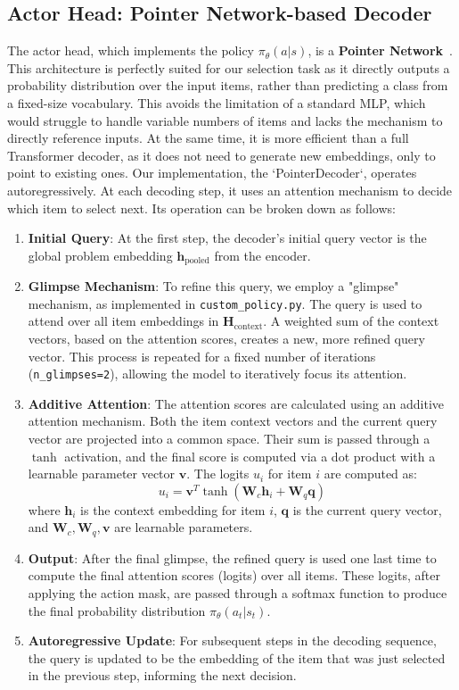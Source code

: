 \subsection{Actor Head: Pointer Network-based Decoder}
The actor head, which implements the policy \(\pi_\theta(a|s)\), is a \textbf{Pointer Network}~\cite{vinyalsPointerNetworks2017}.
This architecture is perfectly suited for our selection task as it directly outputs a probability distribution over the input items, rather than predicting a class from a fixed-size vocabulary.
This avoids the limitation of a standard MLP, which would struggle to handle variable numbers of items and lacks the mechanism to directly reference inputs.
At the same time, it is more efficient than a full Transformer decoder, as it does not need to generate new embeddings, only to point to existing ones.
Our implementation, the `PointerDecoder`, operates autoregressively. At each decoding step, it uses an attention mechanism to decide which item to select next.
Its operation can be broken down as follows:
\begin{enumerate}
    \item \textbf{Initial Query}: At the first step, the decoder's initial query vector is the global problem embedding \(\mathbf{h}_{\text{pooled}}\) from the encoder.
    \item \textbf{Glimpse Mechanism}: To refine this query, we employ a "glimpse" mechanism, as implemented in \texttt{custom\_policy.py}.
The query is used to attend over all item embeddings in \(\mathbf{H}_{\text{context}}\).
A weighted sum of the context vectors, based on the attention scores, creates a new, more refined query vector.
This process is repeated for a fixed number of iterations (\texttt{n\_glimpses=2}), allowing the model to iteratively focus its attention.
    \item \textbf{Additive Attention}: The attention scores are calculated using an additive attention mechanism.
Both the item context vectors and the current query vector are projected into a common space.
Their sum is passed through a \(\tanh\) activation, and the final score is computed via a dot product with a learnable parameter vector \(\mathbf{v}\).
The logits \(u_i\) for item \(i\) are computed as:
    \[ u_i = \mathbf{v}^T \tanh(\mathbf{W}_c \mathbf{h}_i + \mathbf{W}_q \mathbf{q}) \]
    where \(\mathbf{h}_i\) is the context embedding for item \(i\), \(\mathbf{q}\) is the current query vector, and \(\mathbf{W}_c, \mathbf{W}_q, \mathbf{v}\) are learnable parameters.
    \item \textbf{Output}: After the final glimpse, the refined query is used one last time to compute the final attention scores (logits) over all items.
These logits, after applying the action mask, are passed through a softmax function to produce the final probability distribution \(\pi_\theta(a_t|s_t)\).
    \item \textbf{Autoregressive Update}: For subsequent steps in the decoding sequence, the query is updated to be the embedding of the item that was just selected in the previous step, informing the next decision.
\end{enumerate}


